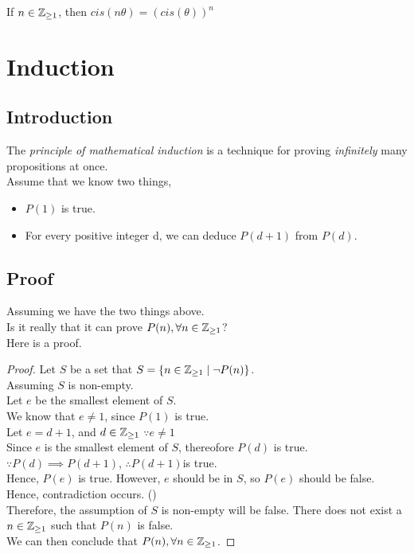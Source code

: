 \documentclass[a4paper]{article}
\begin{document}
\begin{nthm}[Power of $\C$]
If $n \in \mathbb{Z}_{\geq 1}$, then $cis(n\theta) = (cis(\theta))^n$
\end{nthm}


\section{Induction}
\subsection{Introduction}
The \emph{principle of mathematical induction} is a technique for proving \emph{infinitely} many propositions at once.
\vspace{0.5cm}\\
Assume that we know two things,
\begin{itemize}
	\item $P(1)$ is true.
	\item For every positive integer d, we can deduce $P(d + 1)$ from $P(d)$.
\end{itemize}

\subsection{Proof}
Assuming we have the two things above.\\
Is it really that it can prove $P(n), \forall n \in \mathbb{Z}_{\geq 1}$?\\
Here is a proof.
\begin{proof}
Let $S$ be a set that $S = \{n \in \mathbb{Z}_{\geq 1} \mid \lnot P(n)\}$.\\
Assuming $S$ is non-empty.\\
Let $e$ be the smallest element of $S$.\\
We know that $e \neq 1$, since $P(1)$ is true.\\
Let $e = d + 1$, and $d \in \mathbb{Z}_{\geq 1}$ $\because e \neq 1$\\
Since $e$ is the smallest element of $S$, thereofore $P(d)$ is true.\\
$\because P(d) \implies P(d+1)$, $\therefore P(d+1)$is true.\\
Hence, $P(e)$ is true. However, $e$ should be in $S$, so $P(e)$ should be false.\\
Hence, contradiction occurs. (\contradiction)\\
Therefore, the assumption of $S$ is non-empty will be false. There does not exist a $n \in \mathbb{Z}_{\geq 1}$ such that $P(n)$ is false.\\
We can then conclude that $P(n), \forall n \in \mathbb{Z}_{\geq 1}$.
\end{proof}
\end{document}
